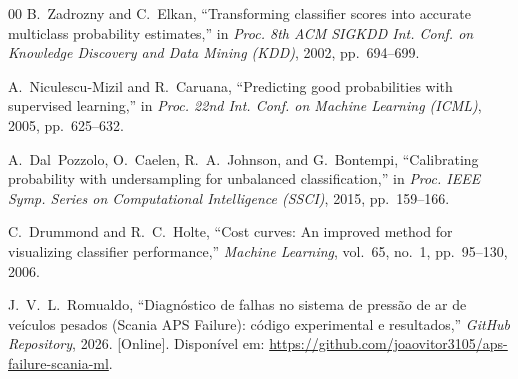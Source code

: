 \documentclass[conference]{IEEEtran}
\begin{document}
\begin{thebibliography}{00}
B.~Zadrozny and C.~Elkan, ``Transforming classifier scores into accurate multiclass probability estimates,'' in \emph{Proc. 8th ACM SIGKDD Int. Conf. on Knowledge Discovery and Data Mining (KDD)}, 2002, pp.~694--699.

A.~Niculescu-Mizil and R.~Caruana, ``Predicting good probabilities with supervised learning,'' in \emph{Proc. 22nd Int. Conf. on Machine Learning (ICML)}, 2005, pp.~625--632.

A.~Dal~Pozzolo, O.~Caelen, R.~A.~Johnson, and G.~Bontempi, ``Calibrating probability with undersampling for unbalanced classification,'' in \emph{Proc. IEEE Symp. Series on Computational Intelligence (SSCI)}, 2015, pp.~159--166.

C.~Drummond and R.~C.~Holte, ``Cost curves: An improved method for visualizing classifier performance,'' \emph{Machine Learning}, vol.~65, no.~1, pp.~95--130, 2006.

J.~V.~L.~Romualdo, ``Diagnóstico de falhas no sistema de pressão de ar de veículos pesados (Scania APS Failure): código experimental e resultados,'' \emph{GitHub Repository}, 2026. [Online]. Disponível em: \url{https://github.com/joaovitor3105/aps-failure-scania-ml}.

\end{thebibliography}
\end{document}
